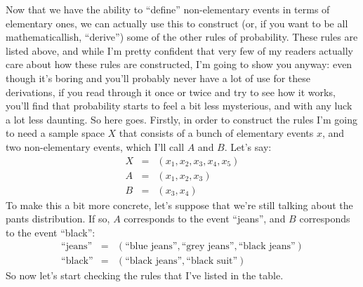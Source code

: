 \documentclass[
]{book}
\begin{document}
Now that we have the ability to ``define'' non-elementary events in terms of elementary ones, we can actually use this to construct (or, if you want to be all mathematicallish, ``derive'') some of the other rules of probability. These rules are listed above, and while I'm pretty confident that very few of my readers actually care about how these rules are constructed, I'm going to show you anyway: even though it's boring and you'll probably never have a lot of use for these derivations, if you read through it once or twice and try to see how it works, you'll find that probability starts to feel a bit less mysterious, and with any luck a lot less daunting. So here goes. Firstly, in order to construct the rules I'm going to need a sample space \(X\) that consists of a bunch of elementary events \(x\), and two non-elementary events, which I'll call \(A\) and \(B\). Let's say: \[\begin{array}{rcl}
X &=& (x_1, x_2, x_3, x_4, x_5) \\
A &=& (x_1, x_2, x_3) \\
B &=& (x_3, x_4)
\end{array}\] To make this a bit more concrete, let's suppose that we're still talking about the pants distribution. If so, \(A\) corresponds to the event ``jeans'', and \(B\) corresponds to the event ``black'': \[\begin{array}{rcl}
\mbox{``jeans''} &=& (\mbox{``blue jeans''}, \mbox{``grey jeans''}, \mbox{``black jeans''}) \\
\mbox{``black''} &=& (\mbox{``black jeans''}, \mbox{``black suit''})
\end{array}\] So now let's start checking the rules that I've listed in the table.
\end{document}
